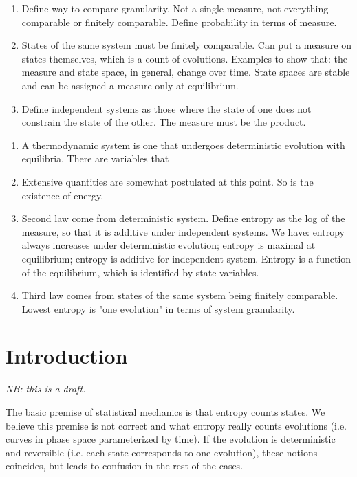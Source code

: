\documentclass[letterpaper]{article}
\begin{document}
\begin{enumerate}
	\item Define way to compare granularity. Not a single measure, not everything comparable or finitely comparable. Define probability in terms of measure.
	\item States of the same system must be finitely comparable. Can put a measure on states themselves, which is a count of evolutions. Examples to show that: the measure and state space, in general, change over time. State spaces are stable and can be assigned a measure only at equilibrium.
	\item Define independent systems as those where the state of one does not constrain the state of the other. The measure must be the product.
	
\end{enumerate}

\begin{enumerate}
	\item A thermodynamic system is one that undergoes deterministic evolution with equilibria. There are variables that  
	\item Extensive quantities are somewhat postulated at this point. So is the existence of energy.
	\item Second law come from deterministic system.  Define entropy as the log of the measure, so that it is additive under independent systems. We have: entropy always increases under deterministic evolution; entropy is maximal at equilibrium; entropy is additive for independent system. Entropy is a function of the equilibrium, which is identified by state variables.
	\item Third law comes from states of the same system being finitely comparable. Lowest entropy is "one evolution" in terms of system granularity.
	
\end{enumerate}


\section{Introduction}

\emph{NB: this is a draft.}

The basic premise of statistical mechanics is that entropy counts states. We believe this premise is not correct and what entropy really counts evolutions (i.e. curves in phase space parameterized by time). If the evolution is deterministic and reversible (i.e. each state corresponds to one evolution), these notions coincides, but leads to confusion in the rest of the cases.
\end{document}
